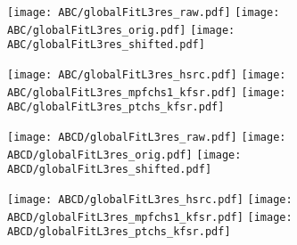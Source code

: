 \documentclass[landscape,10pt]{beamer} %
\newcommand{\commentout}[1]{}
\begin{document}
\newpage

\begin{figure}[p]
\centering
  \texttt{[image: ABC/globalFitL3res\_raw.pdf]}
  \texttt{[image: ABC/globalFitL3res\_orig.pdf]}
  \texttt{[image: ABC/globalFitL3res\_shifted.pdf]}
\end{figure}
\begin{figure}[p]
\centering
  \texttt{[image: ABC/globalFitL3res\_hsrc.pdf]}
  \texttt{[image: ABC/globalFitL3res\_mpfchs1\_kfsr.pdf]}
  \texttt{[image: ABC/globalFitL3res\_ptchs\_kfsr.pdf]}
\end{figure}

\newpage

\begin{figure}[p]
\centering
  \texttt{[image: ABCD/globalFitL3res\_raw.pdf]}
  \texttt{[image: ABCD/globalFitL3res\_orig.pdf]}
  \texttt{[image: ABCD/globalFitL3res\_shifted.pdf]}
\end{figure}
\begin{figure}[p]
\centering
  \texttt{[image: ABCD/globalFitL3res\_hsrc.pdf]}
  \texttt{[image: ABCD/globalFitL3res\_mpfchs1\_kfsr.pdf]}
  \texttt{[image: ABCD/globalFitL3res\_ptchs\_kfsr.pdf]}
\end{figure}

\commentout{
\newpage

\begin{figure}[p]
\centering
  \texttt{[image: L4/globalFitL3res\_raw.pdf]}
  \texttt{[image: L4/globalFitL3res\_orig.pdf]}
  \texttt{[image: L4/globalFitL3res\_shifted.pdf]}
\end{figure}
\begin{figure}[p]
\centering
  \texttt{[image: L4/globalFitL3res\_hsrc.pdf]}
  \texttt{[image: L4/globalFitL3res\_mpfchs1\_kfsr.pdf]}
  \texttt{[image: L4/globalFitL3res\_ptchs\_kfsr.pdf]}
\end{figure}
}%

\commentout{
\newpage

\begin{figure}[p]
\centering
\texttt{[image: drawBCDEFvsGH\_mpfchs1\_ptchs.pdf]}
\texttt{[image: drawEFvsBCD\_mpfchs1\_ptchs.pdf]}
\texttt{[image: drawHvsG\_mpfchs1\_ptchs.pdf]}\\
\texttt{[image: drawBCDEFvsGH\_mpfchs1\_ptchs\_nogjmpf\_mjvsjes.pdf]}
\texttt{[image: drawEFvsBCD\_mpfchs1\_ptchs\_nogjmpf.pdf]}
\texttt{[image: drawHvsG\_mpfchs1\_ptchs\_nogjmpf.pdf]}
\end{figure}
} %
\end{document}
